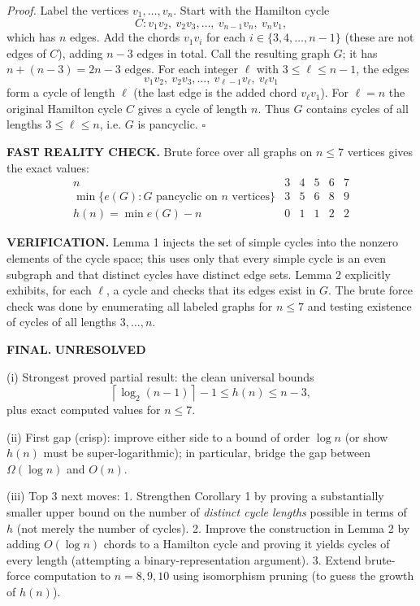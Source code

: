 \textit{Proof.}
Label the vertices $v_1,\dots,v_n$.
Start with the Hamilton cycle
\[
C: v_1v_2,\ v_2v_3,\dots,\ v_{n-1}v_n,\ v_nv_1,
\]
which has $n$ edges.
Add the chords $v_1v_i$ for each $i\in\{3,4,\dots,n-1\}$ (these are not edges of $C$), adding $n-3$ edges in total.
Call the resulting graph $G$; it has $n+(n-3)=2n-3$ edges.
For each integer $\ell$ with $3\le \ell\le n-1$, the edges
\[
v_1v_2,\ v_2v_3,\dots,\ v_{\ell-1}v_{\ell},\ v_{\ell}v_1
\]
form a cycle of length $\ell$ (the last edge is the added chord $v_\ell v_1$).
For $\ell=n$ the original Hamilton cycle $C$ gives a cycle of length $n$.
Thus $G$ contains cycles of all lengths $3\le \ell\le n$, i.e. $G$ is pancyclic.
\hfill$\square$

\medskip
\noindent\textbf{FAST REALITY CHECK.}
Brute force over all graphs on $n\le 7$ vertices gives the exact values:
\[
\begin{array}{c|ccccc}
 n & 3 & 4 & 5 & 6 & 7\\\hline
 \min\{e(G):G\text{ pancyclic on }n\text{ vertices}\} & 3 & 5 & 6 & 8 & 9\\
 h(n)=\min e(G)-n & 0 & 1 & 1 & 2 & 2
\end{array}
\]

\medskip
\noindent\textbf{VERIFICATION.}
Lemma 1 injects the set of simple cycles into the nonzero elements of the cycle space; this uses only that every simple cycle is an even subgraph and that distinct cycles have distinct edge sets.
Lemma 2 explicitly exhibits, for each $\ell$, a cycle and checks that its edges exist in $G$.
The brute force check was done by enumerating all labeled graphs for $n\le 7$ and testing existence of cycles of all lengths $3,\dots,n$.

\medskip
\noindent\textbf{FINAL.}
\textbf{UNRESOLVED}

(i) Strongest proved partial result: the clean universal bounds
\[\left\lceil \log_2(n-1)\right\rceil -1\le h(n)\le n-3,\]
plus exact computed values for $n\le 7$.

(ii) First gap (crisp): improve either side to a bound of order $\log n$ (or show $h(n)$ must be super-logarithmic); in particular, bridge the gap between $\Omega(\log n)$ and $O(n)$.

(iii) Top 3 next moves:
1. Strengthen Corollary 1 by proving a substantially smaller upper bound on the number of \emph{distinct cycle lengths} possible in terms of $h$ (not merely the number of cycles).
2. Improve the construction in Lemma 2 by adding $O(\log n)$ chords to a Hamilton cycle and proving it yields cycles of every length (attempting a binary-representation argument).
3. Extend brute-force computation to $n=8,9,10$ using isomorphism pruning (to guess the growth of $h(n)$).

